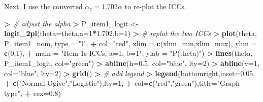 \documentclass[
]{article}
\newenvironment{Shaded}{\begin{snugshade}}{\end{snugshade}}
\newcommand{\AttributeTok}[1]{\textcolor[rgb]{0.13,0.29,0.53}{#1}}
\newcommand{\CommentTok}[1]{\textcolor[rgb]{0.56,0.35,0.01}{\textit{#1}}}
\newcommand{\DecValTok}[1]{\textcolor[rgb]{0.00,0.00,0.81}{#1}}
\newcommand{\ErrorTok}[1]{\textcolor[rgb]{0.64,0.00,0.00}{\textbf{#1}}}
\newcommand{\FloatTok}[1]{\textcolor[rgb]{0.00,0.00,0.81}{#1}}
\newcommand{\FunctionTok}[1]{\textcolor[rgb]{0.13,0.29,0.53}{\textbf{#1}}}
\newcommand{\NormalTok}[1]{#1}
\newcommand{\OtherTok}[1]{\textcolor[rgb]{0.56,0.35,0.01}{#1}}
\newcommand{\SpecialCharTok}[1]{\textcolor[rgb]{0.81,0.36,0.00}{\textbf{#1}}}
\newcommand{\StringTok}[1]{\textcolor[rgb]{0.31,0.60,0.02}{#1}}
\begin{document}
Next, I use the converted \(\alpha_c = 1.702\alpha\) to re-plot the
ICCs.

\begin{Shaded}
\begin{Highlighting}[]
\SpecialCharTok{\textgreater{}} \CommentTok{\# adjust the alpha}
\ErrorTok{\textgreater{}}\NormalTok{ P\_item1\_logit }\OtherTok{\textless{}{-}} \FunctionTok{logit\_2pl}\NormalTok{(}\AttributeTok{theta=}\NormalTok{theta,}\AttributeTok{a=}\DecValTok{1}\SpecialCharTok{*}\FloatTok{1.702}\NormalTok{,}\AttributeTok{b=}\DecValTok{1}\NormalTok{)}
\SpecialCharTok{\textgreater{}} \CommentTok{\# replot the two ICCs}
\ErrorTok{\textgreater{}} \FunctionTok{plot}\NormalTok{(theta, P\_item1\_nom, }\AttributeTok{type =} \StringTok{"l"}\NormalTok{, }
\SpecialCharTok{+}      \AttributeTok{col=}\StringTok{"red"}\NormalTok{, }\AttributeTok{xlim =} \FunctionTok{c}\NormalTok{(xlim\_min,xlim\_max), }\AttributeTok{ylim =} \FunctionTok{c}\NormalTok{(}\DecValTok{0}\NormalTok{,}\DecValTok{1}\NormalTok{),}
\SpecialCharTok{+}      \AttributeTok{main =} \StringTok{"Item 1\textquotesingle{}s ICCs, a=1, b=1"}\NormalTok{, }\AttributeTok{ylab =} \StringTok{"P(theta)"}\NormalTok{)}
\SpecialCharTok{\textgreater{}} \FunctionTok{lines}\NormalTok{(theta, P\_item1\_logit, }\AttributeTok{col=}\StringTok{"green"}\NormalTok{)}
\SpecialCharTok{\textgreater{}} \FunctionTok{abline}\NormalTok{(}\AttributeTok{h=}\FloatTok{0.5}\NormalTok{, }\AttributeTok{col=}\StringTok{"blue"}\NormalTok{, }\AttributeTok{lty=}\DecValTok{2}\NormalTok{)}
\SpecialCharTok{\textgreater{}} \FunctionTok{abline}\NormalTok{(}\AttributeTok{v=}\DecValTok{1}\NormalTok{, }\AttributeTok{col=}\StringTok{"blue"}\NormalTok{, }\AttributeTok{lty=}\DecValTok{2}\NormalTok{)}
\SpecialCharTok{\textgreater{}} \FunctionTok{grid}\NormalTok{()}
\SpecialCharTok{\textgreater{}} \CommentTok{\# add legend}
\ErrorTok{\textgreater{}} \FunctionTok{legend}\NormalTok{(}\StringTok{\textquotesingle{}bottomright\textquotesingle{}}\NormalTok{,}\AttributeTok{inset=}\FloatTok{0.05}\NormalTok{,}
\SpecialCharTok{+}        \FunctionTok{c}\NormalTok{(}\StringTok{"Normal Ogive"}\NormalTok{,}\StringTok{"Logistic"}\NormalTok{),}\AttributeTok{lty=}\DecValTok{1}\NormalTok{,}
\SpecialCharTok{+}        \AttributeTok{col=}\FunctionTok{c}\NormalTok{(}\StringTok{"red"}\NormalTok{,}\StringTok{"green"}\NormalTok{),}\AttributeTok{title=}\StringTok{"Graph type"}\NormalTok{,}
\SpecialCharTok{+}        \AttributeTok{cex=}\FloatTok{0.8}\NormalTok{)}
\end{Highlighting}
\end{Shaded}
\end{document}
